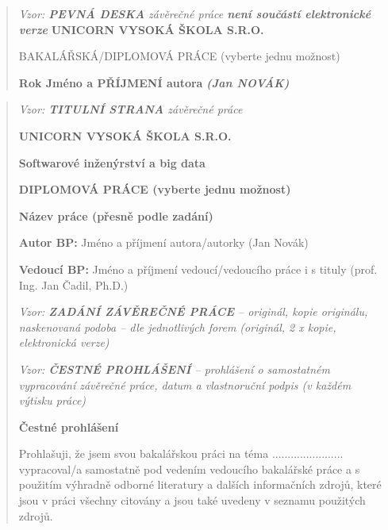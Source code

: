 \documentclass[
]{article}
\author{}
\date{}
\begin{document}
    \pagebreak
    \begin{quote}
        \thispagestyle{empty}
        \emph{Vzor: \textbf{PEVNÁ DESKA} závěrečné práce \textbf{není součástí
        elektronické verze}}
        \textbf{UNICORN VYSOKÁ ŠKOLA S.R.O.}

        \hspace{0pt}
        \vfill
        BAKALÁŘSKÁ/DIPLOMOVÁ PRÁCE (vyberte jednu možnost)
        \vfill
        \hspace{0pt}

        \textbf{Rok Jméno a PŘÍJMENÍ autora}
        \emph{\textbf{(Jan NOVÁK)}}
        \pagebreak
    \end{quote}

    \newpage
    \begin{quote}
        \thispagestyle{empty}
        \emph{Vzor: \textbf{TITULNÍ STRANA} závěrečné práce}

        \textbf{UNICORN VYSOKÁ ŠKOLA S.R.O.}

        \textbf{Softwarové inženýrství a big data}


        \textbf{DIPLOMOVÁ PRÁCE (vyberte jednu možnost)}

        \textbf{Název práce (přesně podle zadání)}

        \textbf{Autor BP:} Jméno a příjmení autora/autorky (Jan Novák)

        \textbf{Vedoucí BP:} Jméno a příjmení vedoucí/vedoucího práce i s tituly
        (prof. Ing. Jan Čadil, Ph.D.)

        \newpage
        \thispagestyle{empty}
        \emph{Vzor: \textbf{ZADÁNÍ ZÁVĚREČNÉ PRÁCE} -- originál, kopie
        originálu, naskenovaná podoba -- dle jednotlivých forem (originál, 2 x
        kopie, elektronická verze)}

        \newpage
        \thispagestyle{empty}
        \emph{Vzor: \textbf{ČESTNÉ PROHLÁŠENÍ} -- prohlášení o samostatném
        vypracování závěrečné práce, datum a vlastnoruční podpis (v každém
        výtisku práce)}

        \textbf{Čestné prohlášení}

        Prohlašuji, že jsem svou bakalářskou práci na téma
        ....................... vypracoval/a samostatně pod vedením vedoucího
        bakalářské práce a s použitím výhradně odborné literatury a dalších
        informačních zdrojů, které jsou v práci všechny citovány a jsou také
        uvedeny v seznamu použitých zdrojů.


\end{quote}
\end{document}

